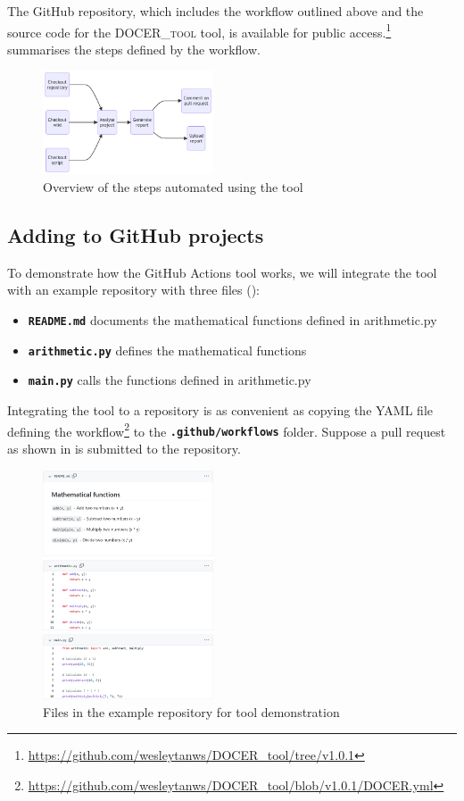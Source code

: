\documentclass[conference]{IEEEtran}
\newcommand{\codeword}[1]{\texttt{\textbf{\footnotesize#1}}}
\newcommand{\tool}{\textsc{DOCER\_tool}}
\begin{document}
The GitHub repository, which includes the workflow outlined above and the source code for the \tool{} tool, is available for public access.\footnote{\url{https://github.com/wesleytanws/DOCER_tool/tree/v1.0.1}}  summarises the steps defined by the workflow.

\begin{figure}[htbp]
    \centering
    \includegraphics[width=0.45\textwidth]{tool_overview.png}
    \caption{Overview of the steps automated using the tool}
    \label{fig:tool_overview}
\end{figure}

\subsection{Adding to GitHub projects}
\label{sec:tool_integration}
To demonstrate how the GitHub Actions tool works, we will integrate the tool with an example repository with three files ():
\begin{itemize}
    \item \codeword{README.md} documents the mathematical functions defined in arithmetic.py
    \item \codeword{arithmetic.py} defines the mathematical functions
    \item \codeword{main.py} calls the functions defined in arithmetic.py
\end{itemize}

Integrating the tool to a repository is as convenient as copying the YAML file defining the workflow\footnote{\url{https://github.com/wesleytanws/DOCER_tool/blob/v1.0.1/DOCER.yml}} to the \codeword{.github/workflows} folder. Suppose a pull request as shown in  is submitted to the repository.

\begin{figure}[htbp]
    \centering
    \includegraphics[width=0.45\textwidth]{tool_example.png}
    \caption{Files in the example repository for tool demonstration}
    \label{fig:tool_example}
\end{figure}
\end{document}
